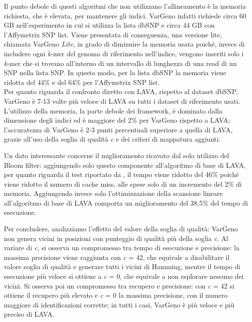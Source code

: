 \documentclass[../main.tex]{subfiles}
\begin{document}
Il punto debole di questi algoritmi che non utilizzano l'allineamento è la memoria richiesta, che è elevata, per mantenere gli indici. VarGeno infatti richiede circa 60 GB nell'esperimento in cui si utilizza la lista dbSNP e circa 44 GB con l'Affymetrix SNP list. Viene presentata di conseguenza, una versione lite, chiamata VarGeno \textit{Lite}, in grado di diminuire la memoria usata poiché, invece di includere ogni \textit{k}-mer del genoma di riferimento nell'indice, vengono inseriti solo i \textit{k}-mer che si trovano all'interno di un intervallo di lunghezza di una read di un SNP nella lista SNP. In questo modo, per la lista dbSNP la memoria viene ridotta del 44\% e del 64\% per l'Affymetrix SNP list.\\

\noindent
Per quanto riguarda il confronto diretto con LAVA, rispetto al dataset dbSNP, VarGeno è 7-13 volte più veloce di LAVA su tutti i dataset di riferimento usati. L'utilizzo della memoria, la parte debole dei framework, è dominato dalla dimensione degli indici ed è maggiore del 2\% per VarGeno rispetto a LAVA; l'accuratezza di VarGeno è 2-3 punti percentuali superiore a quella di LAVA, grazie all'uso della soglia di qualità \textit{c} e dei criteri di mappatura aggiunti. 

Un dato interessante concerne il miglioramento ricavato dal solo utilizzo del Bloom filter: aggiungendo solo questo componente all'algoritmo di base di LAVA, per quanto riguarda il test riportato da \cite{sun-medvedev2018vargeno}, il tempo viene ridotto del 46\% poiché viene ridotto il numero di cache miss, alle spese solo di un incremento del 2\% di memoria. Aggiungendo invece solo l'ottimizzazione della scansione lineare all'algoritmo di base di LAVA comporta un miglioramento del 38,5\% del tempo di esecuzione. 

Per concludere, analizziamo l'effetto del valore della soglia di qualità: VarGeno non genera vicini in posizioni con punteggio di qualità più della soglia \textit{c}. Al variare di \textit{c}, si osserva un compromesso tra tempo di esecuzione e precisione: la massima precisione viene raggiunta con \textit{c} = 42, che equivale a disabilitare il valore soglia di qualità e generare tutti i vicini di Hamming, mentre il tempo di esecuzione più veloce si ottiene a \textit{c} = 0, che equivale a non esplorare nessuno dei vicini. Si osserva poi un compromesso tra recupero e precisione: con \textit{c} = 42 si ottiene il recupero più elevato e \textit{c} = 0 la massima precisione, con il numero maggiore di identificazioni corrette; in tutti i casi, VarGeno è più veloce e più preciso di LAVA. 
\end{document}
